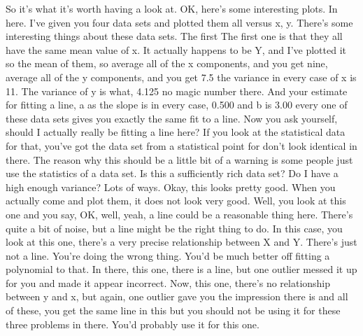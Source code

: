 \documentclass[11pt,a4paper]{article}
\begin{document}
So it's what it's worth having a look at. OK, here's some interesting plots. In here. I've given you four data sets and plotted them all versus x, y. There's some interesting things about these data sets. The first The first one is that they all have the same mean value of x. It actually happens to be Y, and I've plotted it so the mean of them, so average all of the x components, and you get nine, average all of the y components, and you get 7.5 the variance in every case of x is 11. The variance of y is what, 4.125 no magic number there. And your estimate for fitting a line, a as the slope is in every case, 0.500 and b is 3.00 every one of these data sets gives you exactly the same fit to a line. Now you ask yourself, should I actually really be fitting a line here? If you look at the statistical data for that, you've got the data set from a statistical point for don't look identical in there. The reason why this should be a little bit of a warning is some people just use the statistics of a data set. Is this a sufficiently rich data set? Do I have a high enough variance? Lots of ways. Okay, this looks pretty good. When you actually come and plot them, it does not look very good. Well, you look at this one and you say, OK, well, yeah, a line could be a reasonable thing here. There's quite a bit of noise, but a line might be the right thing to do. In this case, you look at this one, there's a very precise relationship between X and Y. There's just not a line. You're doing the wrong thing. You'd be much better off fitting a polynomial to that. In there, this one, there is a line, but one outlier messed it up for you and made it appear incorrect. Now, this one, there's no relationship between y and x, but again, one outlier gave you the impression there is and all of these, you get the same line in this but you should not be using it for these three problems in there. You'd probably use it for this one.
\end{document}

